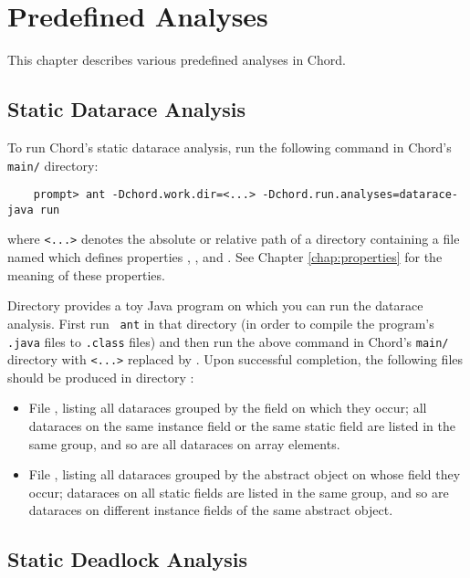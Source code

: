 \chapter{Predefined Analyses}
\label{chap:predefined-analyses}

This chapter describes various predefined analyses in Chord.

\section{Static Datarace Analysis}

To run Chord's static datarace analysis, run the following
command in Chord's {\tt main/} directory:

\begin{verbatim}
    prompt> ant -Dchord.work.dir=<...> -Dchord.run.analyses=datarace-java run
\end{verbatim}

where {\tt <...>} denotes the absolute or relative path of a directory
containing a file named  which defines
properties , , and
.  See Chapter \ref{chap:properties} for the
meaning of these properties.

Directory  provides a toy Java
program on which you can run the datarace analysis.  First run {\tt
  ant} in that directory (in order to compile the program's {\tt
  .java} files to {\tt .class} files) and then run the above command
in Chord's {\tt main/} directory with {\tt <...>} replaced by
.  Upon successful completion, the
following files should be produced in directory
:

\begin{itemize}
\item
File , listing all dataraces grouped by
the field on which they occur; all dataraces on the same instance
field or the same static field are listed in the same group, and so
are all dataraces on array elements.
\item
File , listing all dataraces grouped by
the abstract object on whose field they occur; dataraces on all static
fields are listed in the same group, and so are dataraces on different
instance fields of the same abstract object.
\end{itemize}

\section{Static Deadlock Analysis}

